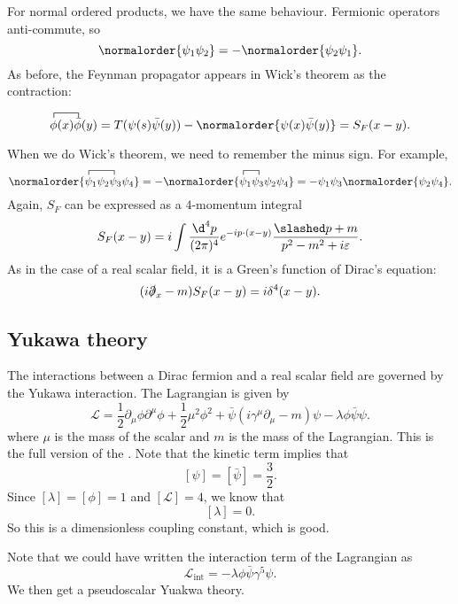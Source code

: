 \documentclass[a4paper]{article}
\begin{document}
For normal ordered products, we have the same behaviour. Fermionic operators anti-commute, so
\[
  \normalorder{\psi_1\psi_2} = - \normalorder{\psi_2\psi_1}.
\]
As before, the Feynman propagator appears in Wick's theorem as the contraction:
\begin{prop}
  \[
    \contraction{}{\phi}{(x)}{\bar\phi}\phi(x) \bar\phi(y) = T(\psi(s) \bar\psi(y)) - \normalorder{\psi(x) \bar\psi(y)} = S_F(x - y).
  \]
\end{prop}
When we do Wick's theorem, we need to remember the minus sign. For example,
\[
  \normalorder{\contraction{}{\psi}{_1\psi_2}{\psi}\psi_1 \psi_2\psi_3\psi_4} = -\normalorder{\contraction{}{\psi}{_1}{\psi_3}\psi_1\psi_3 \psi_2\psi_4} = -\psi_1 \psi_3 \normalorder{\psi_2 \psi_4}.
\]
Again, $S_F$ can be expressed as a $4$-momentum integral
\[
  S_F(x - y) = i \int \frac{\d^4 p}{(2\pi)^4} e^{-ip\cdot (x - y)} \frac{\slashed p + m}{p^2 - m^2 + i \varepsilon}.
\]
As in the case of a real scalar field, it is a Green's function of Dirac's equation:
\[
  (i \slashed\partial_x - m) S_F(x - y) = i \delta^4(x - y).
\]

\subsection{Yukawa theory}
The interactions between a Dirac fermion and a real scalar field are governed by the Yukawa interaction. The Lagrangian is given by
\[
  \mathcal{L} = \frac{1}{2}\partial_\mu \phi \partial^\mu \phi + \frac{1}{2} \mu^2 \phi^2 + \bar\psi (i \gamma^\mu \partial_\mu - m) \psi - \lambda \phi \bar\psi \psi.
\]
where $\mu$ is the mass of the scalar and $m$ is the mass of the Lagrangian. This is the full version of the . Note that the kinetic term implies that
\[
  [\psi] = [\bar\psi] = \frac{3}{2}.
\]
Since $[\lambda] = [\phi] = 1$ and $[\mathcal{L}] = 4$, we know that
\[
  [\lambda] = 0.
\]
So this is a dimensionless coupling constant, which is good.

Note that we could have written the interaction term of the Lagrangian as
\[
  \mathcal{L}_{\mathrm{int}} =- \lambda \phi \bar\psi \gamma^5 \psi.
\]
We then get a pseudoscalar Yuakwa theory.
\end{document}
